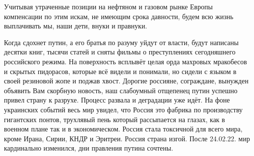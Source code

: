 Учитывая утраченные позиции на нефтяном и газовом рынке Европы компенсации по
этим искам, не имеющим срока давности, будем всю жизнь выплачивать мы, наши
дети, внуки и правнуки.

Когда сдохнет путин, а его братья по разуму уйдут от власти, будут написаны
десятки книг, тысячи статей и сняты фильмы о преступлениях сегодняшнего
российского режима. На поверхность всплывёт целая орда махровых мракобесов и
скрытых пидорасов, которые всё видели и понимали, но сидели с языком в своей
резиновой жопе и поджав хвост. Дорогие россияне, сограждане, вынужден объявить
Вам скорбную новость, наш слабоумный отщепенец путин успешно привел страну к
разрухе. Процесс развала и деградации уже идёт. На фоне украинских событий весь
мир увидел, что Россия это фабрика по производству гигантских понтов, трухлявый
пень который рассыпается на глазах, как в военном плане так и в экономическом.
Россия стала токсичной для всего мира, кроме Ирана, Сирии, КНДР и Эритреи.
Россия страна изгой. После 24.02.22. мир кардинально изменился, дни правления
путина сочтены.
